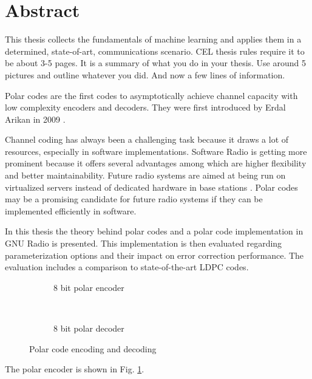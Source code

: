 \chapter*{Abstract}

This thesis collects the fundamentals of machine learning and applies them in a determined, state-of-art, communications scenario.
CEL thesis rules require it to be about 3-5 pages. 
It is a summary of what you do in your thesis.
Use around 5 pictures and outline whatever you did.
And now a few lines of information.


Polar codes are the first codes to asymptotically achieve channel capacity with low complexity encoders and decoders.
They were first introduced by Erdal Arikan in 2009 \cite{Jondral2005}.

Channel coding has always been a challenging task because it draws a lot of resources, especially in software implementations.
Software Radio is getting more prominent because it offers several advantages among which are higher flexibility and better maintainability.
Future radio systems are aimed at being run on virtualized servers instead of dedicated hardware in base stations \cite{Jondral2005}.
Polar codes may be a promising candidate for future radio systems if they can be implemented efficiently in software.

In this thesis the theory behind polar codes and a polar code implementation in GNU Radio is presented.
This implementation is then evaluated regarding parameterization options and their impact on error correction performance.
The evaluation includes a comparison to state-of-the-art \ac{LDPC} codes.


\begin{figure}[!htb]
  \begin{subfigure}[t]{.49\textwidth}
    \begin{center}
      \def\dist{1.5}
      \def\power{3}
      
      \caption{8 bit polar encoder}
      \label{abs:polar_8bit_encoder_natural}
    \end{center}
  \end{subfigure}\,%
  \begin{subfigure}[t]{.49\textwidth}
    \begin{center}
      \def\dist{1.5}
      \def\power{3}
      
      \caption{8 bit polar decoder}
      \label{abs:polar_8bit_decoder}
    \end{center}
  \end{subfigure}%
  \caption{Polar code encoding and decoding}
  \label{abs:encoder-decoder}
\end{figure}

The polar encoder is shown in Fig. \ref{abs:polar_8bit_encoder_natural}.

